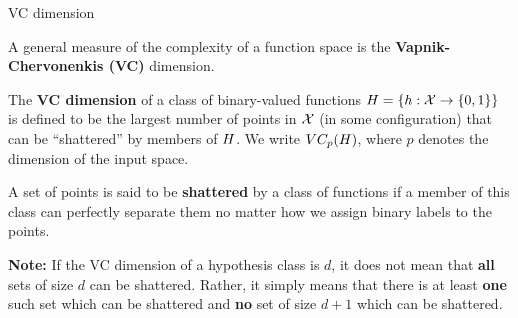 \begin{vbframe}{VC dimension}

A general measure of the complexity of a function space is the \textbf{Vapnik-Chervonenkis (VC)} dimension.

\lz

The \textbf{VC dimension} of a class of binary-valued functions $H = \{h: \mathcal{X} \to \{0, 1\}\}$ is defined to be the largest number of points in $\mathcal{X}$ (in some configuration) that can be \enquote{shattered} by members of $H$. We write $VC_p(H)$, where $p$ denotes the dimension of the input space.

\lz

A set of points is said to be \textbf{shattered} by a class of functions if  a member of this class can perfectly separate them no matter how we assign binary labels to the points.

\lz

\textbf{Note:} If the VC dimension of a hypothesis class is $d$, it does not mean that \textbf{all} sets of size $d$ can be shattered. Rather, it simply means that there is at least \textbf{one} such set which can be shattered and \textbf{no} set of size $d+1$ which can be shattered.
\end{vbframe}



